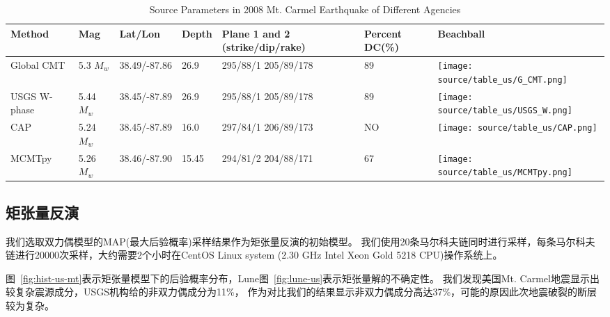 \begin{table}[h]
    \centering
    \caption{Source Parameters in 2008 Mt. Carmel Earthquake of Different Agencies}
    \label{tab:us-1}
      \centering%
      \begin{tabular}{m{2cm}<{\centering}m{1.5cm}<{\centering}m{2cm}<{\centering}m{1cm}<{\centering}m{2cm}<{\centering}m{1cm}<{\centering}m{2cm}<{\centering}}
  
      \toprule
      Method   & Mag & Lat/Lon & Depth & Plane 1 and 2 (strike/dip/rake) & Percent DC(\%) & Beachball    \\
  
      \midrule
      Global CMT &  5.3 $M_{w}$ & 38.49/-87.86 & 26.9 & 295/88/1 205/89/178 & 89 & \texttt{[image: source/table\_us/G\_CMT.png]} \\
      
      USGS W-phase & 5.44 $M_{w}$ & 38.45/-87.89 & 26.9 & 295/88/1 205/89/178 & 89 & \texttt{[image: source/table\_us/USGS\_W.png]} \\
      
      CAP &  5.24 $M_{w}$ & 38.45/-87.89 & 16.0 & 297/84/1 206/89/173 & NO & \texttt{[image: source/table\_us/CAP.png]} \\
      
      MCMTpy & 5.26 $M_{w}$ & 38.46/-87.90 & 15.45 & 294/81/2 204/88/171  & 67 & \texttt{[image: source/table\_us/MCMTpy.png]} \\
      
      \bottomrule
    \end{tabular}
\end{table}



\subsection{矩张量反演}

我们选取双力偶模型的MAP(最大后验概率)采样结果作为矩张量反演的初始模型。
我们使用20条马尔科夫链同时进行采样，每条马尔科夫链进行20000次采样，大约需要2个小时在CentOS Linux system (2.30 GHz Intel Xeon Gold 5218 CPU)操作系统上。

图~\ref{fig:hist-us-mt}表示矩张量模型下的后验概率分布，Lune图~\ref{fig:lune-us}表示矩张量解的不确定性。
我们发现美国Mt. Carmel地震显示出较复杂震源成分，USGS机构给的非双力偶成分为11\%，
作为对比我们的结果显示非双力偶成分高达37\%，可能的原因此次地震破裂的断层较为复杂。

